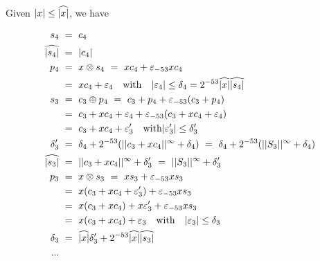 Given $ |x| \leq {\widehat{|x|}}$, we have

\begin{align*}
  s_4 & \ = \ c_4\\
  \widehat{|s_{4}|} & \ = \  |c_4|\\
  p_4 & \ = \  x \otimes s_4 \ = \  x c_4 + \varepsilon_{-53} x c_4 \\
      & \ = \  xc_4 + \varepsilon_4 \quad \mathrm{with} \quad |\varepsilon_4| \le \delta_4 = 2^{-53}{\widehat{|x|}} \widehat{|s_{4}|}\\
  s_3 & \ = \  c_3 \oplus p_4 \ = \  c_3 + p_4 + \varepsilon_{-53}(c_3 + p_4) \\
      & \ = \  c_3 +  xc_4 + \varepsilon_4 + \varepsilon_{-53}(c_3 + xc_4 + \varepsilon_4) \\
      & \ = \  c_3 +  xc_4 + \varepsilon'_3  
      \quad \mathrm{with} |\varepsilon'_3| \le \delta'_3\\
  \delta'_3 & \ =\  \delta_4 + 2^{-53}(||{c_3 + xc_4}||^{\infty} + \delta_4)\  =\  \delta_4 + 2^{-53}(||{S_3}||^{\infty} + \delta_4)\\
  \widehat{|s_{3}|} & \ = \  ||{c_3 + xc_4}||^{\infty} + \delta'_3 \ = \  ||{S_3}||^{\infty} + \delta'_3\\ 
  p_3 & \ = \  x \otimes s_3 \ = \  x s_3 + \varepsilon_{-53} x s_3 \\
      & \ = \  x(c_3 +  xc_4 + \varepsilon'_3) + \varepsilon_{-53} x s_3\\
      & \ = \  x(c_3 +  xc_4) + x\varepsilon'_3 + \varepsilon_{-53} x s_3\\
      & \ = \  x(c_3 +  xc_4) +  \varepsilon_3 \quad \mathrm{with} \quad 
      |\varepsilon_3| \le \delta_3\\
  \delta_3 & \ =\ {\widehat{|x|}}\delta'_3 + 2^{-53} {\widehat{|x|}} \widehat{|s_{3}|}\\
...
\end{align*}


